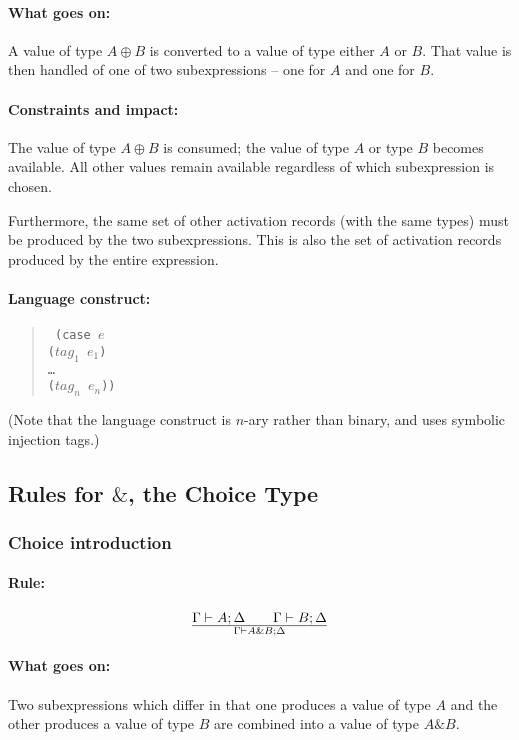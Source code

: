 \documentclass[a4paper]{article}
\begin{document}
\paragraph{What goes on:} A value of type $A \oplus B$ is converted to
a value of type either $A$ or $B$. That value is then handled of one
of two subexpressions -- one for $A$ and one for $B$.

\paragraph{Constraints and impact:} The value of type $A \oplus B$ is
consumed; the value of type $A$ or type $B$ becomes available.
All other values remain available regardless of which subexpression is chosen.

Furthermore, the same set of other activation records (with the same
types) must be produced by the two subexpressions. This is also the
set of activation records produced by the entire expression.

\paragraph{Language construct:}
\begin{quote}\tt
  (case $e$\\
  \phantom{ }\quad ($\mathit{tag_1}$ $\mathit{e_1}$)\\
  \phantom{ }\quad \ldots\\
  \phantom{ }\quad ($\mathit{tag_n}$ $\mathit{e_n}$))
\end{quote}
(Note that the language construct is $n$-ary rather than binary, and
uses symbolic injection tags.)



\subsection{Rules for $\&$, the Choice Type}

\subsubsection{Choice introduction}

\paragraph{Rule:}
$$
{
  \Gamma \vdash A; \Delta
  \qquad
  \Gamma \vdash B; \Delta
}\over{
  \Gamma \vdash A\&B; \Delta
}
$$
\paragraph{What goes on:} Two subexpressions which differ in that one
produces a value of type $A$ and the other produces a value of type
$B$ are combined into a value of type $A\&B$.
\end{document}
